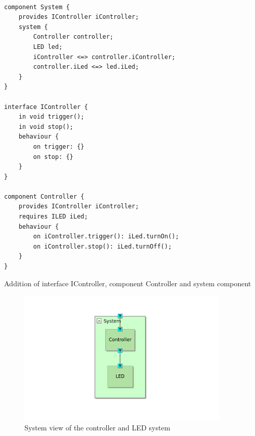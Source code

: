 \documentclass[12pt]{scrreprt}
\begin{document}
\begin{appendices}
\begin{listing}[!ht]
\begin{verbatim}
               
component System {
	provides IController iController;
	system {
		Controller controller;
		LED led;
		iController <=> controller.iController;
		controller.iLed <=> led.iLed;
	}
}

interface IController {
	in void trigger();
	in void stop();
	behaviour {
		on trigger: {}
		on stop: {}
	}
}

component Controller {
	provides IController iController;
	requires ILED iLed;
	behaviour {
		on iController.trigger(): iLed.turnOn();
		on iController.stop(): iLed.turnOff();
	}
}

\end{verbatim}
\caption{Addition of interface IController, component Controller and system component}
\label{Addition of interface IController, component Controller and system component}
\end{listing}
               

\begin{figure}[H]
    \centering
    \includegraphics[width=0.9\textwidth]{Figures/theoretical_background/sys_view.png}
    \caption{System view of the controller and LED system}
    \label{System view of the controller and led system}
\end{figure}


\end{appendices}
\end{document}
